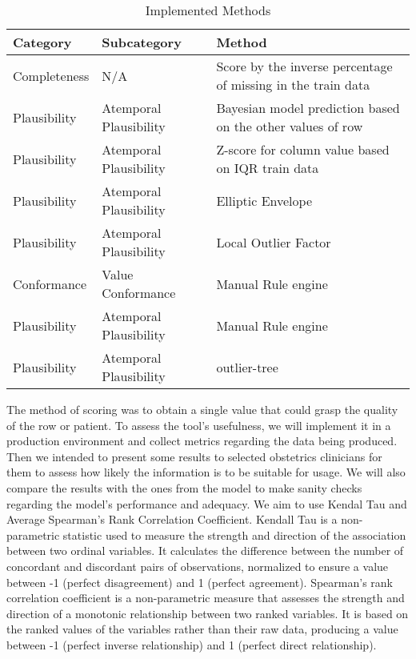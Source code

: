 \begin{table}[htpb]
\caption{Implemented Methods} \label{tab:methods}
\renewcommand{\arraystretch}{1.4}
\setlength{\tabcolsep}{10pt}

\begin{tabularx}{\textwidth}{ p{2cm} p{3.5cm} X }
\hline
 Category   & Subcategory           & Method   \\ \hline
Completeness     & N/A               & Score by the inverse percentage of missing in the train data         \\ 
Plausibility & Atemporal Plausibility & Bayesian model prediction based on the other values of row \\ 
Plausibility & Atemporal Plausibility         & Z-score for column value based on IQR train data       \\    
Plausibility & Atemporal Plausibility           & Elliptic Envelope                       \\ 
Plausibility & Atemporal Plausibility           & Local Outlier Factor                \\ 
Conformance & Value Conformance           & Manual Rule engine                           \\ 
Plausibility & Atemporal Plausibility           & Manual Rule engine                      \\ 
Plausibility & Atemporal Plausibility           & outlier-tree                      \\ 
\hline
\end{tabularx}

\end{table}
The method of scoring was to obtain a single value that could grasp the quality of the row or patient.
To assess the tool's usefulness, we will implement it in a production environment and collect metrics regarding the data being produced. Then we intended to present some results to selected obstetrics clinicians for them to assess how likely the information is to be suitable for usage. We will also compare the results with the ones from the model to make sanity checks regarding the model's performance and adequacy. We aim to use Kendal Tau and Average Spearman's Rank Correlation Coefficient. Kendall Tau is a non-parametric statistic used to measure the strength and direction of the association between two ordinal variables. It calculates the difference between the number of concordant and discordant pairs of observations, normalized to ensure a value between -1 (perfect disagreement) and 1 (perfect agreement). Spearman's rank correlation coefficient is a non-parametric measure that assesses the strength and direction of a monotonic relationship between two ranked variables. It is based on the ranked values of the variables rather than their raw data, producing a value between -1 (perfect inverse relationship) and 1 (perfect direct relationship).
